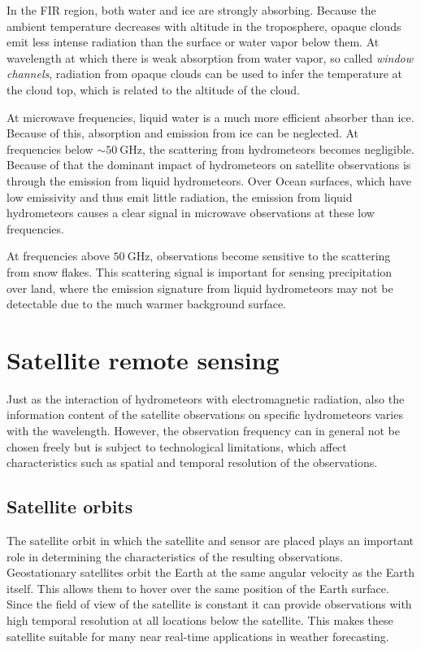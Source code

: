 In the FIR region, both water and ice are strongly absorbing. Because the
ambient temperature decreases with altitude in the troposphere, opaque clouds
emit less intense radiation than the surface or water vapor below them.
At wavelength at which there is weak absorption from water vapor, so called
\textit{window channels}, radiation from opaque clouds can be used to
infer the temperature at the cloud top, which is related to the altitude of
the cloud.

At microwave frequencies, liquid water is a much more efficient absorber than
ice. Because of this, absorption and emission from ice can be neglected. At
frequencies below $\sim \SI{50}{\giga \hertz}$, the scattering from hydrometeors
becomes negligible. Because of that the dominant impact of hydrometeors on
satellite observations is through the emission from liquid hydrometeors. Over
Ocean surfaces, which have low emissivity and thus emit little radiation, the
emission from liquid hydrometeors causes a clear signal in microwave
observations at these low frequencies.

At frequencies above $\SI{50}{\giga \hertz}$, observations become
sensitive to the scattering from snow flakes. This scattering signal is
important for sensing precipitation over land, where the emission signature from
liquid hydrometeors may not be detectable due to the much warmer background
surface.

\section{Satellite remote sensing}

Just as the interaction of hydrometeors with electromagnetic radiation,
also the information content of the satellite observations  on specific
hydrometeors varies with the wavelength. However, the observation frequency
can in general not be chosen freely but is subject to technological
limitations, which affect characteristics such as spatial and temporal
resolution of the observations.


\subsection{Satellite orbits}

The satellite orbit in which the satellite and sensor are placed plays an
important role in determining the characteristics of the resulting observations.
Geostationary satellites orbit the Earth at the same angular velocity as the
Earth itself.  This allows
them to hover over the same position of the Earth surface. Since the field of
view of the satellite is constant it can provide observations with high temporal
resolution at all locations below the satellite. This makes these satellite
suitable for many near real-time applications in weather forecasting.

